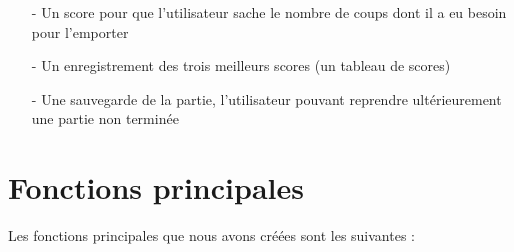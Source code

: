 \documentclass[french]{article}
\begin{document}
\begin{itemize}

\item[-] Un score pour que l'utilisateur sache le nombre de coups dont il a eu besoin pour l'emporter
\item[-] Un enregistrement des trois meilleurs scores (un tableau de scores)
\item[-] Une sauvegarde de la partie, l'utilisateur pouvant reprendre ultérieurement une partie non terminée

\end{itemize}

\section{Fonctions principales}

Les fonctions principales que nous avons créées sont les suivantes :
\end{document}
